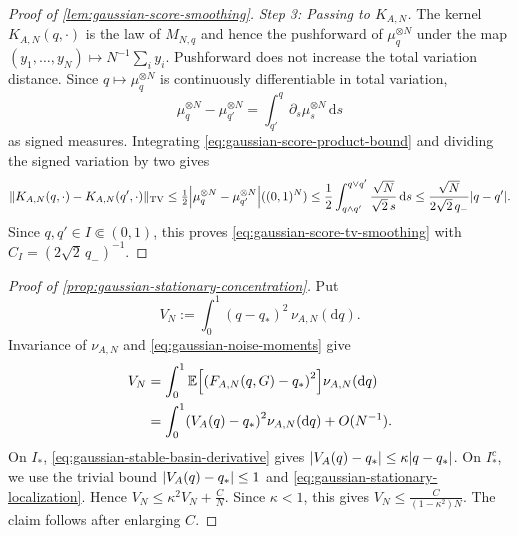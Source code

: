 \documentclass[11pt,reqno,a4paper]{article}
\newcommand{\Ee}{\E}
\newcommand{\TV}{\mathrm{TV}}
\begin{document}
\begin{proof}[Proof of \cref{lem:gaussian-score-smoothing}]
  \emph{Step 3: Passing to $K_{A,N}$.}
  The kernel $K_{A,N}(q,\cdot)$ is the law of $M_{N,q}$ and hence the
  pushforward of $\mu_q^{\otimes N}$ under the map
  $(y_1,\ldots,y_N)\mapsto N^{-1}\sum_i y_i$. Pushforward does not increase the
  total variation distance. Since $q\mapsto\mu_q^{\otimes N}$ is continuously
  differentiable in total variation,
  \begin{equation*}
    \mu_q^{\otimes N}-\mu_{q'}^{\otimes N}
    =
    \int_{q'}^q\partial_s\mu_s^{\otimes N}\,\mathrm{d}s
  \end{equation*}
  as signed measures. Integrating \cref{eq:gaussian-score-product-bound} and
  dividing the signed variation by two gives
  \begin{equation*}
    \norm{K_{A,N}(q,\cdot)-K_{A,N}(q',\cdot)}_{\TV}
    \leq
    \tfrac12\abs{\mu_q^{\otimes N}-\mu_{q'}^{\otimes N}}((0,1)^N)
    \leq
    \frac12\int_{q\wedge q'}^{q\vee q'}\frac{\sqrt N}{\sqrt2\,s}\,\mathrm{d}s
    \leq
    \frac{\sqrt N}{2\sqrt2\,q_-}\abs{q-q'} .
  \end{equation*}
  Since $q,q'\in I\Subset(0,1)$, this proves
  \cref{eq:gaussian-score-tv-smoothing} with $C_I=(2\sqrt2\,q_-)^{-1}$.
\end{proof}

\begin{proof}[Proof of \cref{prop:gaussian-stationary-concentration}]
  Put
  \begin{equation*}
    V_N:=
    \int_0^1 (q-q_\ast)^2\,\nu_{A,N}(\mathrm{d}q).
  \end{equation*}
  Invariance of $\nu_{A,N}$ and \cref{eq:gaussian-noise-moments} give
  \begin{align}
    V_N
    &=
    \int_0^1
    \Ee\left[
      \left(F_{A,N}(q,G)-q_\ast\right)^2
    \right]
    \nu_{A,N}(\mathrm{d}q)
    \notag\\
    &=
    \int_0^1
    \left(V_A(q)-q_\ast\right)^2
    \nu_{A,N}(\mathrm{d}q)
    +
    O(N^{-1}).
    \label{eq:gaussian-stationary-concentration-step}
  \end{align}
  On $I_\ast$, \cref{eq:gaussian-stable-basin-derivative} gives
  $
    \abs{V_A(q)-q_\ast}
    \leq
    \kappa\abs{q-q_\ast}
  $.
  On $I_\ast^c$, we use the trivial bound
  $
    \abs{V_A(q)-q_\ast}\leq1
  $
  and \cref{eq:gaussian-stationary-localization}. Hence
  $
    V_N
    \leq
    \kappa^2 V_N+\frac{C}{N}
  $.
  Since $\kappa<1$, this gives
  $
    V_N\leq \frac{C}{(1-\kappa^2)N}
  $.
  The claim follows after enlarging $C$.
\end{proof}
\end{document}
